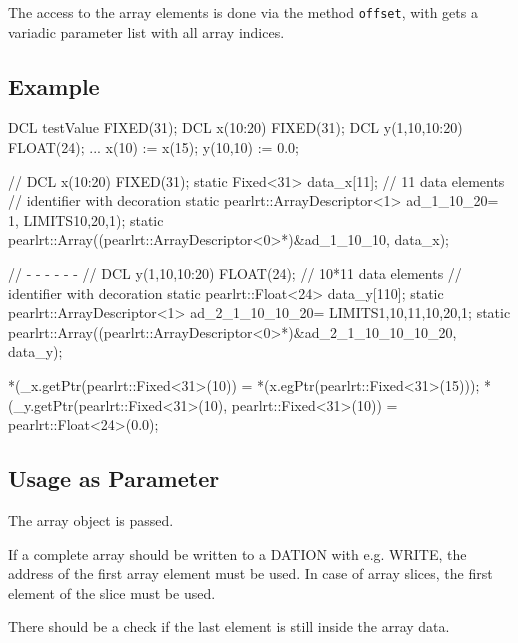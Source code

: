 The access to the array elements is done via the method \verb|offset|, 
with gets a variadic parameter list with all array indices.

\subsection{Example}

\begin{PEARLCode}
DCL testValue FIXED(31); 
DCL x(10:20) FIXED(31); 
DCL y(1,10,10:20) FLOAT(24); 
...
x(10) := x(15);
y(10,10) := 0.0;
\end{PEARLCode}


\begin{CppCode}
// DCL x(10:20) FIXED(31); 
static Fixed<31> data_x[11]; // 11 data elements
                             // identifier with decoration
static pearlrt::ArrayDescriptor<1> ad_1_10_20={ 1, LIMITS{{10,20,1}}});
static pearlrt::Array((pearlrt::ArrayDescriptor<0>*)&ad_1_10_10, data_x);

// - - - - - - 
// DCL y(1,10,10:20) FLOAT(24); 
 // 10*11 data elements
 // identifier with decoration
static pearlrt::Float<24> data_y[110];
static pearlrt::ArrayDescriptor<1> ad_2_1_10_10_20=
       LIMITS{{1,10,11},{10,20,1}};
static pearlrt::Array((pearlrt::ArrayDescriptor<0>*)&ad_2_1_10_10_10_20, data_y);

   *(_x.getPtr(pearlrt::Fixed<31>(10)) =
             *(x.egPtr(pearlrt::Fixed<31>(15)));
   *(_y.getPtr(pearlrt::Fixed<31>(10), pearlrt::Fixed<31>(10)) =
                          pearlrt::Float<24>(0.0);

\end{CppCode}

\subsection{Usage as Parameter}
The array object is passed. 

If a complete array should be written to a DATION with e.g. WRITE,
the address of the first array element must be used.
In case of array slices, the first element of the slice must be used.

There should be a check if the last element is still inside the array data.


